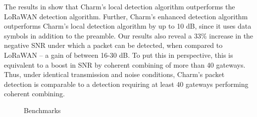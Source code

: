 The results in  show that Charm's local detection
algorithm outperforms the LoRaWAN detection algorithm. Further, Charm's
enhanced detection algorithm outperforms Charm's local detection algorithm by
up to 10 dB, since it uses data symbols in addition to the preamble. Our
results also reveal a 33\% increase in the negative SNR under which a packet
can be detected, when compared to LoRaWAN -- a gain of between 16-30 dB. To
put this in perspective, this is equivalent to a boost in SNR by coherent
combining of more than 40 gateways. Thus, under identical transmission and
noise conditions, Charm's packet detection is comparable to a detection
requiring at least 40 gateways performing coherent combining.

\begin{figure}[!t]
\centering
{}
\hfill
{}
\hfill
{}
\compactimg
\caption{Benchmarks}
\label{fig:results}
\compactimg
\end{figure}

